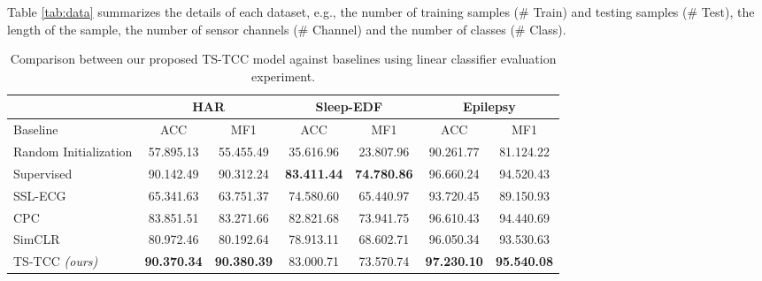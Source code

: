 \documentclass{article}
\begin{document}
Table \ref{tab:data} summarizes the details of each dataset, e.g., the number of training samples (\# Train) and testing samples (\# Test), the length of the sample, the number of sensor channels (\# Channel) and the number of classes (\# Class).

\begin{table*}\centering

\begin{tabular}{@{}l|cc|cc|cc@{}}
\toprule
 & \multicolumn{2}{c|}{HAR} & \multicolumn{2}{c|}{Sleep-EDF} & \multicolumn{2}{c}{Epilepsy} \\ \midrule
Baseline       & ACC           & MF1           & ACC           & MF1           & ACC           & MF1           \\ \midrule

Random Initialization  & 57.895.13 & 55.455.49 & 35.616.96 & 23.807.96 & 90.261.77 & 81.124.22 \\ 

Supervised      & 90.142.49 & 90.312.24 & \textbf{83.411.44} & \textbf{74.780.86} & 96.660.24 & 94.520.43 \\

SSL-ECG \cite{ecg_emotion_rec}  & 65.341.63 & 63.751.37 & 74.580.60 & 65.440.97 & 93.720.45 & 89.150.93 \\

CPC \cite{oord2018representation} & 83.851.51 & 83.271.66 & 82.821.68 & 73.941.75 & 96.610.43 & 94.440.69 \\ 

SimCLR \cite{chen2020simple} & 80.972.46 & 80.192.64 & 78.913.11 & 68.602.71  & 96.050.34 & 93.530.63 \\


TS-TCC \textit{(ours)} & \textbf{90.370.34} & \textbf{90.380.39} & 83.000.71 & 73.570.74 & \textbf{97.230.10} & \textbf{95.540.08} \\ 
\bottomrule

\end{tabular}
\caption{Comparison between our proposed TS-TCC model against baselines using linear classifier evaluation experiment.}


\label{tbl:fine_linear}
\end{table*}
 
\end{document}
